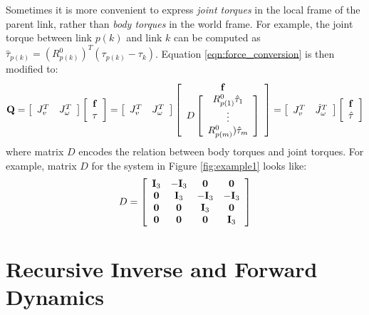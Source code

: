 Sometimes it is more convenient to express \emph{joint torques} in the
local frame of the parent link, rather than \emph{body torques} in the
world frame. For example, the joint torque between link $p(k)$ and
link $k$ can be computed as $\hat{\tau}_{p(k)} = (R^0_{p(k)})^T(\tau_{p(k)} -
\tau_k)$. Equation \ref{eqn:force_conversion} is then modified to:
\begin{equation}
\mathbf{Q} = \left[
\begin{array}{cc}
J_{v}^T & J_\omega^T
\end{array}
\right]
\left[
\begin{array}{c}
\mathbf{f} \\
\tau
\end{array}
\right] 
 = \left[
\begin{array}{cc}
J_{v}^T & J_\omega^T
\end{array}
\right]
\left[
\begin{array}{c}
\mathbf{f} \\
D 
\left[
\begin{array}{c}
R^0_{p(1)} \hat{\tau}_1 \\
\vdots \\
R^0_{p(m)}) \hat{\tau}_m
\end{array}
\right]
\end{array}
\right] =
\left[
\begin{array}{cc}
J_{v}^T & \hat{J}_\omega^T
\end{array}
\right]
\left[
\begin{array}{c}
\mathbf{f} \\
\hat{\tau}
\end{array}
\right]  
\end{equation}
where matrix $D$ encodes the relation between body torques and joint
torques. For example, matrix $D$ for the system in Figure \ref{fig:example1} looks
like:
\begin{equation}
D =
\left[
\begin{array}{cccc}
\vc{I}_{3\time 3}  & -\vc{I}_{3\time 3} & \vc{0} & \vc{0}\\
\vc{0} & \vc{I}_{3\time 3}  & -\vc{I}_{3\time 3} & -\vc{I}_{3\time 3}\\
\vc{0} & \vc{0} & \vc{I}_{3\time 3}  & \vc{0}\\
\vc{0} & \vc{0} & \vc{0} & \vc{I}_{3\time 3}\\
\end{array}
\right]  
\end{equation}


\section{Recursive Inverse and Forward Dynamics}